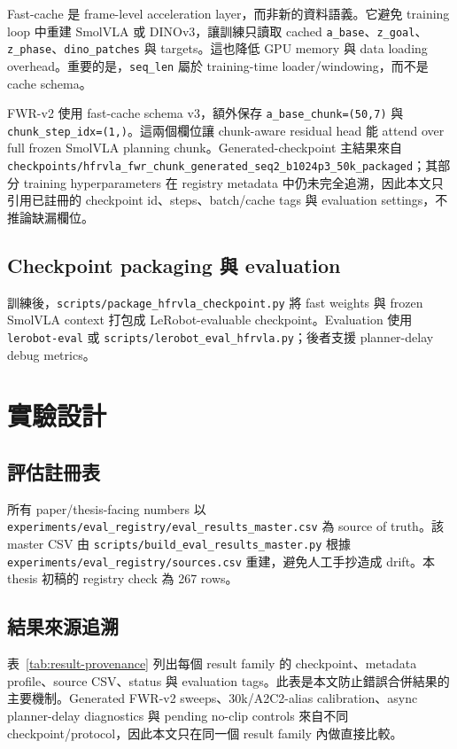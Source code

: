 \documentclass[12pt,a4paper,oneside]{report}
\newcommand{\smolvla}{SmolVLA}
\begin{document}
Fast-cache 是 frame-level acceleration layer，而非新的資料語義。它避免 training loop 中重建 \smolvla{} 或 DINOv3，讓訓練只讀取 cached \texttt{a\_base}、\texttt{z\_goal}、\texttt{z\_phase}、\texttt{dino\_patches} 與 targets。這也降低 GPU memory 與 data loading overhead。重要的是，\texttt{seq\_len} 屬於 training-time loader/windowing，而不是 cache schema。

FWR-v2 使用 fast-cache schema v3，額外保存 \texttt{a\_base\_chunk=(50,7)} 與 \texttt{chunk\_step\_idx=(1,)}。這兩個欄位讓 chunk-aware residual head 能 attend over full frozen \smolvla{} planning chunk。Generated-checkpoint 主結果來自 \texttt{checkpoints/hfrvla\_fwr\_chunk\_generated\_seq2\_b1024p3\_50k\_packaged}；其部分 training hyperparameters 在 registry metadata 中仍未完全追溯，因此本文只引用已註冊的 checkpoint id、steps、batch/cache tags 與 evaluation settings，不推論缺漏欄位。

\section{Checkpoint packaging 與 evaluation}

訓練後，\texttt{scripts/package\_hfrvla\_checkpoint.py} 將 fast weights 與 frozen \smolvla{} context 打包成 LeRobot-evaluable checkpoint。Evaluation 使用 \texttt{lerobot-eval} 或 \texttt{scripts/lerobot\_eval\_hfrvla.py}；後者支援 planner-delay debug metrics。

\chapter{實驗設計}
\label{chap:experiments}

\section{評估註冊表}

所有 paper/thesis-facing numbers 以 \texttt{experiments/eval\_registry/eval\_results\_master.csv} 為 source of truth。該 master CSV 由 \texttt{scripts/build\_eval\_results\_master.py} 根據 \texttt{experiments/eval\_registry/sources.csv} 重建，避免人工手抄造成 drift。本 thesis 初稿的 registry check 為 267 rows。

\section{結果來源追溯}

表~\ref{tab:result-provenance} 列出每個 result family 的 checkpoint、metadata profile、source CSV、status 與 evaluation tags。此表是本文防止錯誤合併結果的主要機制。Generated FWR-v2 sweeps、30k/A2C2-alias calibration、async planner-delay diagnostics 與 pending no-clip controls 來自不同 checkpoint/protocol，因此本文只在同一個 result family 內做直接比較。
\end{document}

